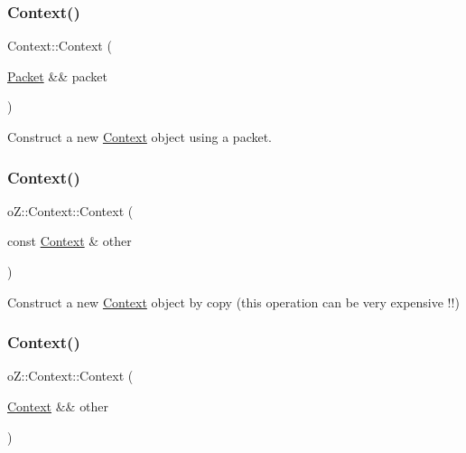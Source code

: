 \subsubsection{\texorpdfstring{Context()}{Context()}\hspace{0.1cm}{\footnotesize\ttfamily [2/4]}}
{\footnotesize\ttfamily Context\+::\+Context (\begin{DoxyParamCaption}\item[{\mbox{\hyperlink{classo_z_1_1_packet}{Packet}} \&\&}]{packet }\end{DoxyParamCaption})}



Construct a new \mbox{\hyperlink{classo_z_1_1_context}{Context}} object using a packet. 

\mbox{\label{classo_z_1_1_context_a906eb29f22e89bc121c47096c7a4b601}} 
\subsubsection{\texorpdfstring{Context()}{Context()}\hspace{0.1cm}{\footnotesize\ttfamily [3/4]}}
{\footnotesize\ttfamily o\+Z\+::\+Context\+::\+Context (\begin{DoxyParamCaption}\item[{const \mbox{\hyperlink{classo_z_1_1_context}{Context}} \&}]{other }\end{DoxyParamCaption})\hspace{0.3cm}{\ttfamily [default]}}



Construct a new \mbox{\hyperlink{classo_z_1_1_context}{Context}} object by copy (this operation can be very expensive !!) 

\mbox{\label{classo_z_1_1_context_ad4a49704266f6e8312b1c9c2ca8ad710}} 
\subsubsection{\texorpdfstring{Context()}{Context()}\hspace{0.1cm}{\footnotesize\ttfamily [4/4]}}
{\footnotesize\ttfamily o\+Z\+::\+Context\+::\+Context (\begin{DoxyParamCaption}\item[{\mbox{\hyperlink{classo_z_1_1_context}{Context}} \&\&}]{other }\end{DoxyParamCaption})\hspace{0.3cm}{\ttfamily [default]}}



